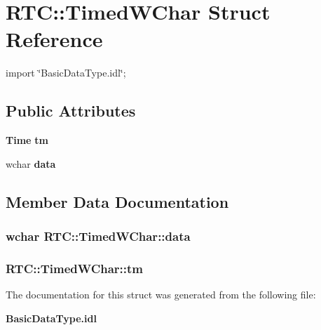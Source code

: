\section{RTC::TimedWChar Struct Reference}
\label{structRTC_1_1TimedWChar}


{\ttfamily import \char`\"{}BasicDataType.idl\char`\"{};}

\subsection*{Public Attributes}
\begin{DoxyCompactItemize}
\item 
{\bf Time} {\bf tm}
\item 
wchar {\bf data}
\end{DoxyCompactItemize}


\subsection{Member Data Documentation}
\subsubsection[{data}]{\setlength{\rightskip}{0pt plus 5cm}wchar {\bf RTC::TimedWChar::data}}\label{structRTC_1_1TimedWChar_aab03a9cfe9456f67c52307ba22f2a18e}
\subsubsection[{tm}]{ {\bf RTC::TimedWChar::tm}}\label{structRTC_1_1TimedWChar_a8049ca8b61d0a05e28181776e5437fca}


The documentation for this struct was generated from the following file:\begin{DoxyCompactItemize}
\item 
{\bf BasicDataType.idl}\end{DoxyCompactItemize}
